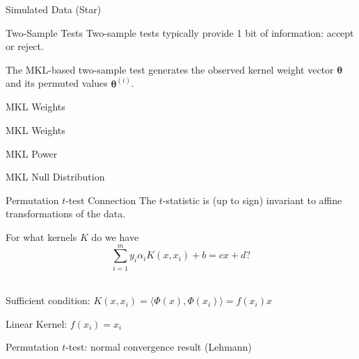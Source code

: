 \documentclass{beamer}
\begin{document}
\begin{frame}{Simulated Data (Star)}
  \begin{center}
    \resizebox{10.0cm}{!}{
      
    }
  \end{center}
\end{frame}

\begin{frame}{Two-Sample Tests}
  Two-sample tests typically provide 1 bit of information: accept or reject. \\ \pause

  The MKL-based two-sample test generates the observed kernel weight vector ${\boldsymbol \theta}$ and
  its permuted values ${\boldsymbol \theta}^{(i)}$.
\end{frame}

\begin{frame}{MKL Weights}
  \begin{center}
    \resizebox{10.0cm}{!}{
      
    }
  \end{center}
\end{frame}

\begin{frame}{MKL Weights}
  \begin{center}
    \resizebox{10.0cm}{!}{
      
    }
  \end{center}
\end{frame}

\begin{frame}{MKL Power}
  \begin{center}
    \resizebox{10.0cm}{!}{
      
    }
  \end{center}
\end{frame}

\begin{frame}{MKL Null Distribution}
  \begin{center}
    \resizebox{10.0cm}{!}{
      
    }
  \end{center}
\end{frame}

\begin{frame}{Permutation $t$-test Connection}
  The $t$-statistic is (up to sign) invariant to affine transformations of the data. \\ \pause

  For what kernels $K$ do we have
  \begin{equation*}
    \sum_{i=1}^m y_i \alpha_i K(x, x_i) + b = cx + d?
  \end{equation*} \\ \pause

  Sufficient condition: $K(x, x_i) = \langle \Phi(x), \Phi(x_i) \rangle =
  f(x_i) x$ \\ \pause

  Linear Kernel: $f(x_i) = x_i$ \\ \pause

  Permutation $t$-test: normal convergence result (Lehmann)
\end{frame}
\end{document}

